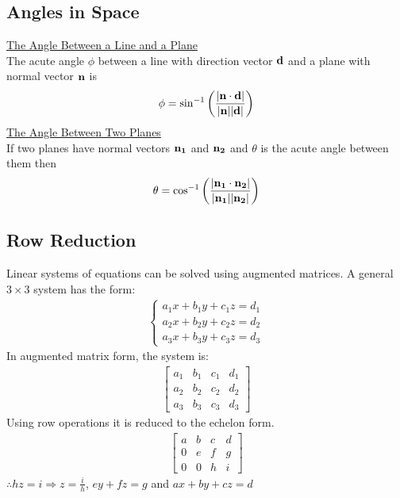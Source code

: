 \documentclass[10pt, a4paper, titlepage]{article}
\begin{document}
\begin{multicols*}{3}
	\subsection{Angles in Space}
	\underline{The Angle Between a Line and a Plane}\\
	The acute angle $\phi$ between a line with direction vector $\vb{d}$ and a plane with normal vector $\vb{n}$ is
	\begin{align}
		\phi=\sin^{-1}{\left(\frac{|\vb{n}\cdot\vb{d}|}{|\vb{n}||\vb{d}|}\right)}
	\end{align}
	\underline{The Angle Between Two Planes}\\
	If two planes have normal vectors $\vb{n_1}$ and $\vb{n_2}$ and $\theta$ is the acute angle between them then
	\begin{align}
		\theta=\cos^{-1}{\left(\frac{|\vb{n_1}\cdot\vb{n_2}|}{|\vb{n_1}||\vb{n_2}|}\right)}
	\end{align}

	\dotfill
	\subsection{Row Reduction}
	Linear systems of equations can be solved using augmented matrices. A general $3\times 3$ system has the form:
	\begin{align}
		\begin{cases}
			a_1x+b_1y+c_1z=d_1\\
			a_2x+b_2y+c_2z=d_2\\
			a_3x+b_3y+c_3z=d_3
		\end{cases}
	\end{align}
	In augmented matrix form, the system is:
	\begin{align}
		\left[
			\begin{array}{ccc|c}
				a_1 & b_1 & c_1 & d_1\\
				a_2 & b_2 & c_2 & d_2\\
				a_3 & b_3 & c_3 & d_3
			\end{array}
		\right]
	\end{align}
	Using row operations it is reduced to the echelon form.
	\begin{align}
		\left[
			\begin{array}{ccc|c}
				a & b & c & d\\
				0 & e & f & g\\
				0 & 0 & h & i
			\end{array}
		\right]
	\end{align}
	$\therefore hz=i\Rightarrow z=\frac{i}{h}$, $ey+fz=g$ and $ax+by+cz=d$


\end{multicols*}
\end{document}
